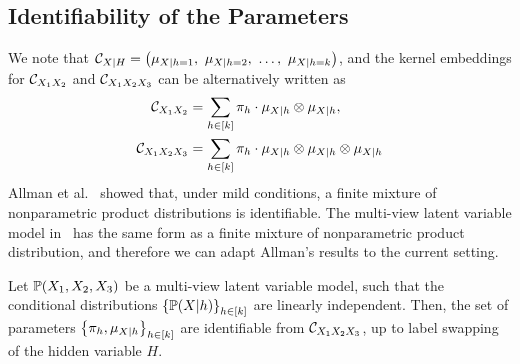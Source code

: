 \documentclass{article}
\begin{document}
\subsection{Identifiability of the Parameters}

We note that $\mathcal{C}_{X|H} = \left(\mu_{X|h=1},\ \mu_{X|h=2},\ \ldots,\ \mu_{X|h=k}\right)$, and the kernel embeddings for $\mathcal{C}_{X_1 X_2}$ and $\mathcal{C}_{X_1 X_2 X_3}$ can be alternatively written as
\begin{align}
	\mathcal{C}_{X_1 X_2}
  & = \sum_{h \in [k]} \pi_h\cdot \mu_{X|h} \otimes \mu_{X|h}, \label{eq:joint2} \\
  \mathcal{C}_{X_1 X_2 X_3}
  &= \sum_{h \in [k]} \pi_h\cdot \mu_{X|h} \otimes \mu_{X|h} \otimes \mu_{X|h} \label{eq:joint3}
\end{align}
Allman et al.~\cite{x} showed that, under mild conditions, a finite mixture of nonparametric product distributions is identifiable. The multi-view latent variable model in~ has the same form as a finite mixture of nonparametric product distribution, and therefore we can adapt Allman's results to the current setting.
\begin{proposition}[Identifiability]\label{prop:identifiability}
  Let $\mathbb{P}(X_1,X_2,X_3)$ be a multi-view latent variable model, such that the conditional distributions $\left\{\mathbb{P}(X|h)\right\}_{h \in [k]}$ are linearly independent. Then, the set of parameters $\left\{\pi_h, \mu_{X|h}\right\}_{h \in [k]}$ are identifiable from $\mathcal{C}_{X_1 X_2 X_3}$, up to label swapping of the hidden variable $H$.
\end{proposition}


\end{document}
